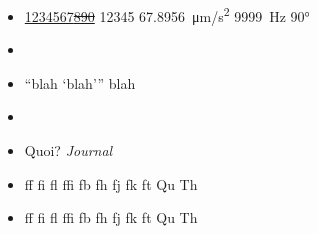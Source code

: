 \documentclass[a4paper, 11pt]{lt_article}
\begin{document}
\textbf{\blindtext}

\textsc{\blindtext}

\newpage

\textsf{\blindtext}

\textsf{\textit{\blindtext}}

\textsf{\textbf{\blindtext}}

\texttt{\blindtext}

\newpage

\begin{itemize}

    \item \uline{1234567\sout{890}} \num{12345} \SI{67.8956}{\um/\s^2}
        \SI{9999}{\hertz} \ang{90}

    \item \LuaTeX\ \LuaLaTeX

    \item \enquote{blah \enquote{blah}} blah

    \item \eg \ie \cf \etc

    \item Quoi? \textit{Journal}

    \item ff fi fl ffi fb fh fj fk ft Qu Th

    \item \textsf{ff fi fl ffi fb fh fj fk ft Qu Th}

\end{itemize}

\end{document}
